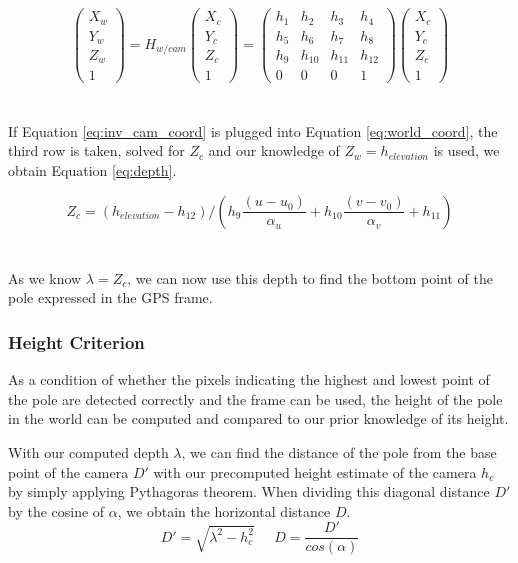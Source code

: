 \begin{equation}
 \begin{pmatrix} X_w \\ Y_w\\ Z_w \\ 1 \end{pmatrix}  = H_{w/cam}\begin{pmatrix}  X_c \\ Y_c\\ Z_c \\ 1\end{pmatrix} = \begin{pmatrix} h_1 & h_2 & h_3 & h_4\\ h_5 & h_6 & h_7 & h_8 \\ h_9 & h_{10} & h_{11} & h_{12} \\ 0 & 0 & 0 & 1 \end{pmatrix}  \begin{pmatrix} X_c \\ Y_c\\ Z_c \\ 1 \end{pmatrix}
\label{eq:world_coord}
\end{equation}
\\
\\
If Equation \ref{eq:inv_cam_coord} is plugged into Equation \ref{eq:world_coord}, the third row is taken, solved for $Z_c$ and our knowledge of $Z_w = h_{elevation}$ is used, we obtain Equation \ref{eq:depth}.

\begin{equation}
 Z_c = (h_{elevation} - h_{12})/( h_9  \frac{( u - u_0)}{\alpha_u} + h_{10}  \frac{(v - v_0)}{\alpha_v} + h_{11})
\label{eq:depth}
\end{equation}
\\
\\
As we know $\lambda = Z_c$, we can now use this depth to find the bottom point of the pole expressed in the GPS frame.


\subsubsection{Height Criterion}
As a condition of whether the pixels indicating the highest and lowest point of the pole are detected correctly and the frame can be used, the height of the pole in the world can be computed and compared to our prior knowledge of its height.

With our computed depth $\lambda$, we can find the distance of the pole from the base point of the camera $D'$ with our precomputed height estimate of the camera $h_c$ by simply applying Pythagoras theorem. When dividing this diagonal distance $D'$ by the cosine of $\alpha$, we obtain the horizontal distance $D$. 
\begin{equation}
D' = \sqrt{\lambda ^2 - h_c^2} \; \; \; \; \; D = \frac{D'}{cos(\alpha)}
\label{eq:horizontal_distance}
\end{equation}

